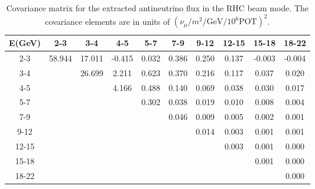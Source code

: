 \begin{table}[ht]
\begin{centering}
\begin{tabular}{|c|c c c c c c c c c|}
\hline
E(GeV)&2-3&3-4&4-5&5-7&7-9&9-12&12-15&15-18&18-22\\\hline
2-3&58.944&17.011&-0.415&0.032&0.386&0.250&0.137&-0.003&-0.004\\
3-4& &26.699&2.211&0.623&0.370&0.216&0.117&0.037&0.020\\
4-5& & &4.166&0.488&0.140&0.069&0.038&0.030&0.017\\
5-7& & & &0.302&0.038&0.019&0.010&0.008&0.004\\
7-9& & & & &0.046&0.009&0.005&0.002&0.001\\
9-12& & & & & &0.014&0.003&0.001&0.001\\
12-15& & & & & & &0.003&0.001&0.000\\
15-18& & & & & & & &0.001&0.000\\
18-22& & & & & & & & &0.000\\
\hline
\end{tabular}
\caption{Covariance matrix for the extracted antineutrino flux in the RHC beam mode.  The covariance elements are in units of  $(\nu_{\mu}/m^{2}/\textrm{GeV}/10^{6} \textrm{POT})^{2}$.}
\end{centering}
\end{table}

